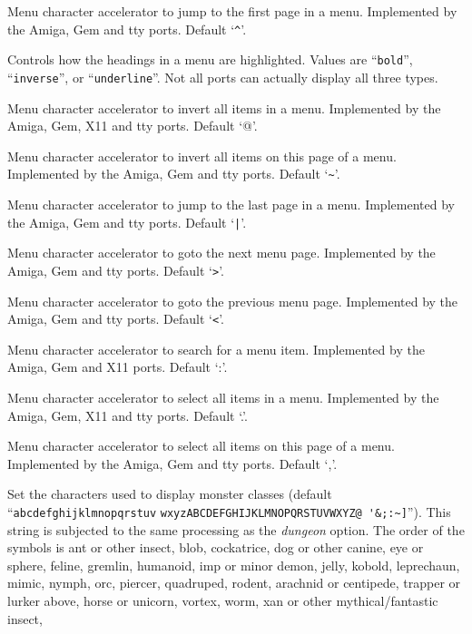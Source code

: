 \item[\ib{menu\_first\_page}]
Menu character accelerator to jump to the first page in a menu.
Implemented by the Amiga, Gem and tty ports.
Default `\verb+^+'.
\item[\ib{menu\_headings}]
Controls how the headings in a menu are highlighted.
Values are ``{\tt bold}'', ``{\tt inverse}'', or ``{\tt underline}''.
Not all ports can actually display all three types.
\item[\ib{menu\_invert\_all}]
Menu character accelerator to invert all items in a menu.
Implemented by the Amiga, Gem, X11 and tty ports. 
Default `@'.
\item[\ib{menu\_invert\_page}]
Menu character accelerator to invert all items on this page of a menu.
Implemented by the Amiga, Gem and tty ports.
Default `\verb+~+'.
\item[\ib{menu\_last\_page}]
Menu character accelerator to jump to the last page in a menu.
Implemented by the Amiga, Gem and tty ports.
Default `\verb+|+'.
\item[\ib{menu\_next\_page}]
Menu character accelerator to goto the next menu page.
Implemented by the Amiga, Gem and tty ports.
Default `\verb+>+'.
\item[\ib{menu\_previous\_page}]
Menu character accelerator to goto the previous menu page.
Implemented by the Amiga, Gem and tty ports.
Default `\verb+<+'.
\item[\ib{menu\_search}]
Menu character accelerator to search for a menu item.
Implemented by the Amiga, Gem and X11 ports.
Default `:'.
\item[\ib{menu\_select\_all}]
Menu character accelerator to select all items in a menu.
Implemented by the Amiga, Gem, X11 and tty ports.
Default `.'.
\item[\ib{menu\_select\_page}]
Menu character accelerator to select all items on this page of a menu.
Implemented by the Amiga, Gem and tty ports.
Default `,'.
\item[\tb{monsters}]
Set the characters used to display monster classes (default
``\verb+abcdefghijklmnopqrstuv+
\verb+wxyzABCDEFGHIJKLMNOPQRSTUVWXYZ@ '&;:~]+'').
This string is subjected to the same processing as the
{\it dungeon }
option.
The order of the symbols is
ant or other insect, blob, cockatrice,
dog or other canine, eye or sphere, feline,
gremlin, humanoid, imp or minor demon,
jelly, kobold, leprechaun,
mimic, nymph, orc,
piercer, quadruped, rodent,
arachnid or centipede, trapper or lurker above, horse or unicorn,
vortex, worm, xan or other mythical/fantastic insect,
